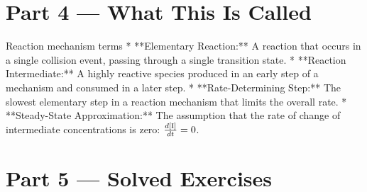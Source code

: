 \documentclass[12pt, a4paper]{book}
\begin{document}
\newpage

\section{Part 4 --- What This Is Called}

\begin{namedconcept}{Reaction mechanism terms}
* **Elementary Reaction:** A reaction that occurs in a single collision event, passing through a single transition state.
* **Reaction Intermediate:** A highly reactive species produced in an early step of a mechanism and consumed in a later step.
* **Rate-Determining Step:** The slowest elementary step in a reaction mechanism that limits the overall rate.
* **Steady-State Approximation:** The assumption that the rate of change of intermediate concentrations is zero: $\frac{d[\ce{I}]}{dt} = 0$.
\end{namedconcept}

\newpage

\section{Part 5 --- Solved Exercises}
\end{document}
